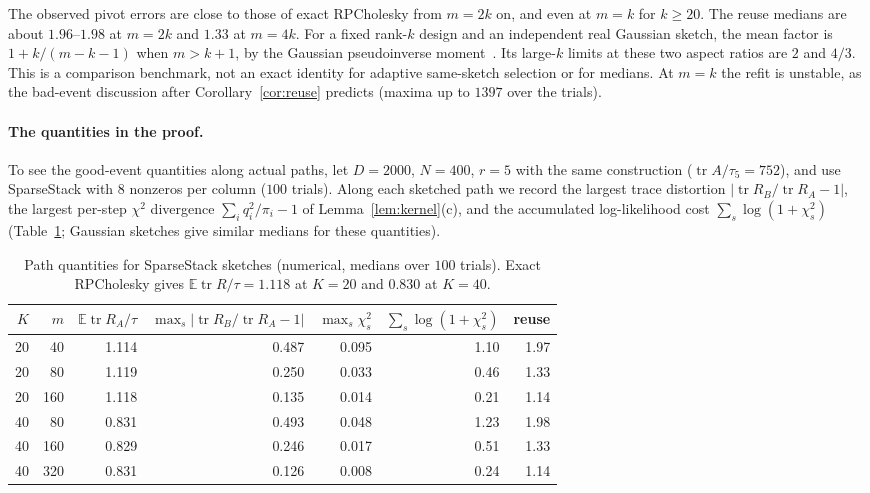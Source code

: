 \documentclass[11pt]{article}
\theoremstyle{definition}\newtheorem{definition}[theorem]{Definition}
\theoremstyle{remark}\newtheorem{remark}[theorem]{Remark}
\newcommand{\E}{\mathbb E}
\newcommand{\tr}{\operatorname{tr}}
\newcommand{\1}{\mathbf 1}
\begin{document}
The observed pivot errors are close to those of exact RPCholesky from
$m=2k$ on, and even at $m=k$ for $k\ge20$. The reuse medians are about
$1.96$--$1.98$ at $m=2k$ and $1.33$ at $m=4k$.
For a fixed rank-$k$ design and an independent real Gaussian sketch,
the mean factor is $1+k/(m-k-1)$ when $m>k+1$, by the Gaussian
pseudoinverse moment~\cite[Proposition 10.2]{HMT}. Its large-$k$ limits
at these two aspect ratios are $2$ and $4/3$. This is a comparison
benchmark, not an exact identity for adaptive same-sketch selection or
for medians.
At $m=k$ the refit is unstable, as the
bad-event discussion after Corollary~\ref{cor:reuse} predicts (maxima
up to $1397$ over the trials).

\paragraph{The quantities in the proof.}
To see the good-event quantities along actual paths, let $D=2000$,
$N=400$, $r=5$ with the same construction ($\tr A/\tau_5=752$), and use
SparseStack with $8$ nonzeros per column ($100$ trials). Along each
sketched path we record the largest trace distortion
$|\tr R_B/\tr R_A-1|$, the largest per-step $\chi^2$ divergence
$\sum_iq_i^2/\pi_i-1$ of Lemma~\ref{lem:kernel}(c), and the accumulated
log-likelihood cost $\sum_s\log(1+\chi^2_s)$
(Table~\ref{tab:sk-path}; Gaussian sketches give similar medians for
these quantities).

\begin{table}[ht]
\centering
\begin{tabular}{rrrrrrr}
\toprule
$K$ & $m$ & $\E\tr R_A/\tau$ & $\max_s|\tr R_B/\tr R_A-1|$ & $\max_s\chi^2_s$ & $\sum_s\log(1+\chi^2_s)$ & reuse\\
\midrule
20 & 40 & 1.114 & 0.487 & 0.095 & 1.10 & 1.97\\
20 & 80 & 1.119 & 0.250 & 0.033 & 0.46 & 1.33\\
20 & 160 & 1.118 & 0.135 & 0.014 & 0.21 & 1.14\\
40 & 80 & 0.831 & 0.493 & 0.048 & 1.23 & 1.98\\
40 & 160 & 0.829 & 0.246 & 0.017 & 0.51 & 1.33\\
40 & 320 & 0.831 & 0.126 & 0.008 & 0.24 & 1.14\\
\bottomrule
\end{tabular}
\caption{Path quantities for SparseStack sketches (numerical, medians
over $100$ trials). Exact RPCholesky gives $\E\tr R/\tau=1.118$ at
$K=20$ and $0.830$ at $K=40$.}
\label{tab:sk-path}
\end{table}
\end{document}
